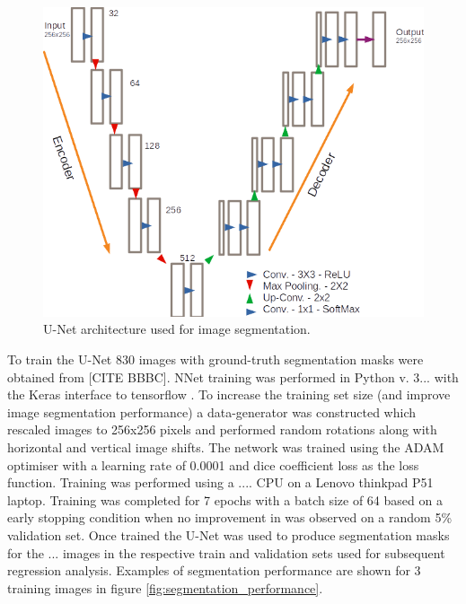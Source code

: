 \documentclass[isoft]{poster_class_UofC}
\begin{document}
\begin{poster}
        \begin{figure}
                    \centering
            \captionsetup{type=figure}
            \includegraphics[scale=1]{./images/UNet_Arch.png}
            \caption{U-Net architecture used for image segmentation.}
            \label{fig:U-NET}
        \end{figure}
        
        To train the U-Net 830 images with ground-truth segmentation masks were obtained from [CITE BBBC].  NNet training was performed in Python v. 3... with the Keras interface to tensorflow \cite{chollet2015keras}.  To increase the training set size (and improve image segmentation performance) a data-generator was constructed which rescaled images to 256x256 pixels and performed random rotations along with horizontal and vertical image shifts.  The network was trained using the ADAM optimiser with a learning rate of 0.0001 and dice coefficient loss as the loss function.  Training was performed using a .... CPU on a Lenovo thinkpad P51 laptop.  Training was completed for 7 epochs with a batch size of 64 based on a early stopping condition when no improvement in was observed on a random 5\% validation set.  Once trained the U-Net was used to produce segmentation masks for the ... images in the respective train and validation sets used for subsequent regression analysis.  Examples of segmentation performance are shown for 3 training images in figure \ref{fig:segmentation_performance}.
        

\end{poster}
\end{document}
